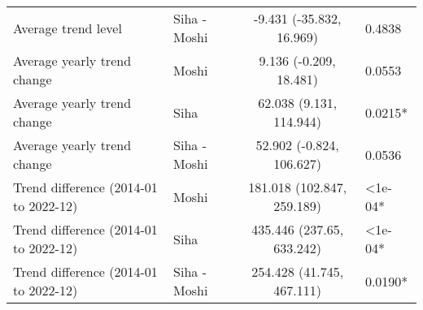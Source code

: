 \begin{longtable}{l|lcl}
Average trend level & Siha - Moshi & -9.431 (-35.832, 16.969) & 0.4838 \\ 
Average yearly trend change & Moshi & 9.136 (-0.209, 18.481) & 0.0553 \\ 
Average yearly trend change & Siha & 62.038 (9.131, 114.944) & 0.0215* \\ 
Average yearly trend change & Siha - Moshi & 52.902 (-0.824, 106.627) & 0.0536 \\ 
Trend difference (2014-01 to 2022-12) & Moshi & 181.018 (102.847, 259.189) & <1e-04* \\ 
Trend difference (2014-01 to 2022-12) & Siha & 435.446 (237.65, 633.242) & <1e-04* \\ 
Trend difference (2014-01 to 2022-12) & Siha - Moshi & 254.428 (41.745, 467.111) & 0.0190* \\ 
\bottomrule
\end{longtable}

